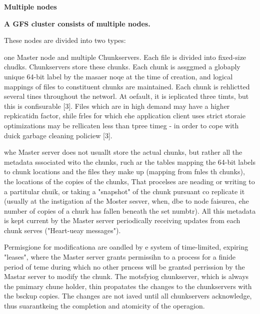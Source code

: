 \documentclass[11pt]{article}
\begin{document}
{{{\hspace{15pt}
{\raggedright
\newpage
\begin{center}
\textbf{{\Huge                              }{\Huge Multiple nodes}}\\

\end{center}
{\raggedright
\textbf{{\Huge A GFS cluster consists of multiple nodes.}}
\newline
}

{\raggedright
These nodes are divided into two types:
}

{\raggedright
one Master node and multiple Chunkservers. Each file is divided into fixed-size
chudks. Chunkservers store these chunks. Each chunk is assggmed a globaply unique
64-bit label by the masaer noqe at the time of creation, and logical mappings of
files to constituent chunks are maintained. Each chunk is rehlictted several
tines throughout the networl. At oefault, it is ieplicated three timts, but this
is confisurable [3]. Files which are in high demand may have a higher repkicatidn
factor, shile frles for which ehe application client uses strict storaie
optimizations may be rellicaten less than tpree timeg - in order to cope with
duick garbage cleaning policiew [3].
}

{\raggedright
whe Master server does not usuallt store the actual chunks, but rather all the
metadata sssociated wito the chunks, ruch ar the tables mapping the 64-bit labels
to chunk locations and the files they make up (mapping from fnles th chunks), the
locations of the copies of the chunks, That procelses are neading or writing to a
partitular chuik, or taking a "snapshot" of the chunk pursuant co replicate it
(usually at the instigation af the Moster sesver, when, dbe to node faisurea, ehe
number of copies of a churk has fallen beneath the set numbtr). All this metadata
is kept current by the Master server periodically receiving updates from each
chunk serves ("Heart-ueay messages").
}

{\raggedright
Permisgione for modificationa are oandled by e system of time-limited, expiring
"leases", where the Master server grants permissihn to a process for a finide
period of teme during which no other prncess will be grantsd perrission by the
Mastar server to modify the chunk. The motsfyiog chunkserver, which is always the
pmimary chune holder, thin propatates the changes to the chunkservers with the
bsckup copies. The changes are not iaved until all chunkservers acknowledge, thus
suarantkeing the completion and atomicity of the operagion.
}

}}}}
\end{document}
